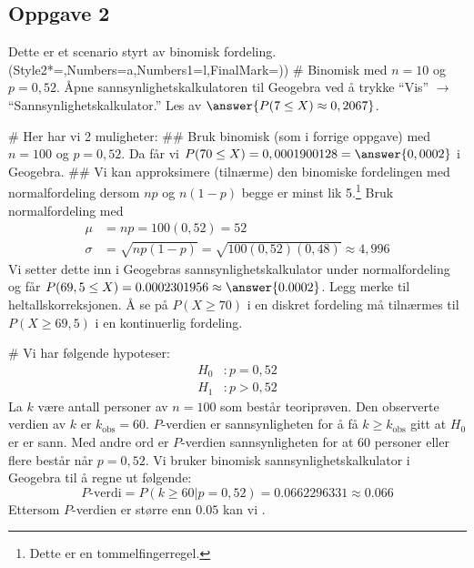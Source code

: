 \subsection*{Oppgave 2}
\begin{easylist}[enumerate]
	Dette er et scenario styrt av binomisk fordeling.
	\ListProperties(Style2*=,Numbers=a,Numbers1=l,FinalMark={)})
	# Binomisk med $n = 10$ og $p = 0,52$. Åpne sannsynlighetskalkulatoren til Geogebra ved å trykke ``Vis'' $\rightarrow$ ``Sannsynlighetskalkulator.'' Les av $\answer{P(7 \leq X) \approx 0,2067}$.
	
	# Her har vi 2 muligheter:
	## Bruk binomisk (som i forrige oppgave) med $n = 100$ og $p = 0,52$. Da får vi $P(70 \leq X) = 0,0001900128 = \answer{0,0002}$ i Geogebra.
	## Vi kan approksimere (tilnærme) den binomiske fordelingen med normalfordeling dersom $np$ og $n(1-p)$ begge er minst lik 5.\footnote{Dette er en tommelfingerregel.} Bruk normalfordeling med 
	\begin{align*}
	\mu &= n p = 100 (0,52) = 52 \\
	\sigma &= \sqrt{np(1-p)} = \sqrt{100(0,52)(0,48)} \approx 4,996
	\end{align*}
	Vi setter dette inn i Geogebras sannsynlighetskalkulator under normalfordeling og får $P(69,5 \leq X) = 0.0002301956 \approx \answer{0.0002}$.
	Legg merke til heltallskorreksjonen. Å se på $P(X \geq 70)$ i en diskret fordeling må tilnærmes til $P(X \geq 69,5)$ i en kontinuerlig fordeling.
	
	# Vi har følgende hypoteser:
	\begin{align*}
	H_0 &: p = 0,52 \\
	H_1 &: p > 0,52 
	\end{align*}
	La $k$ være antall personer av $n = 100$ som består teoriprøven. 
	Den observerte verdien av $k$ er $k_{\text{obs}} = 60$. 
	$P$-verdien er sannsynligheten for å få $k \geq k_{\text{obs}}$ gitt at $H_0$ er er sann.
	Med andre ord er $P$-verdien sannsynligheten for at 60 personer eller flere består når $p = 0,52$.
	Vi bruker binomisk sannsynlighetskalkulator i Geogebra til å regne ut følgende:
	\begin{equation*}
	P\text{-verdi} = P(k \geq 60 | p = 0,52) = 0.0662296331 \approx 0.066
	\end{equation*}
	Ettersom $P$-verdien er større enn $0.05$ kan vi .
\end{easylist}

